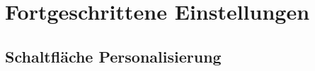 
\chapter{Fortgeschrittene Einstellungen}
\label{chap:advanced-settings}

\section{Schaltfläche Personalisierung}
\label{sec:advanced-quick-access}